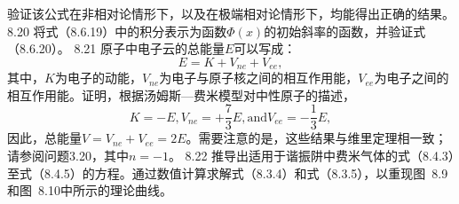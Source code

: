 验证该公式在非相对论情形下，以及在极端相对论情形下，均能得出正确的结果。
8.20 将式（8.6.19）中的积分表示为函数\(\Phi(x)\)的初始斜率的函数，并验证式（8.6.20）。
8.21 原子中电子云的总能量\(E\)可以写成：
\begin{equation}\tag{8.21.1}\label{eq:8.21.1}
E = K + V _ { n e } + V _ { e e } ,
\end{equation}
其中，\(K\)为电子的动能，\(V_{ne}\)为电子与原子核之间的相互作用能，\(V_{ee}\)为电子之间的相互作用能。证明，根据汤姆斯---费米模型对中性原子的描述，
\begin{equation}\tag{8.21.2}\label{eq:8.21.2}
K = - E ,  V _ { n e } = + \frac { 7 } { 3 } E ,  \mathrm { a n d }  V _ { e e } = - \frac { 1 } { 3 } E ,
\end{equation}
因此，总能量\(V = V_{ne} + V_{ee} = 2E\)。需要注意的是，这些结果与维里定理相一致；请参阅问题3.20，其中\(n = -1\)。
8.22 推导出适用于谐振阱中费米气体的式（8.4.3）至式（8.4.5）的方程。通过数值计算求解式（8.3.4）和式（8.3.5），以重现图~8.9和图~8.10中所示的理论曲线。


